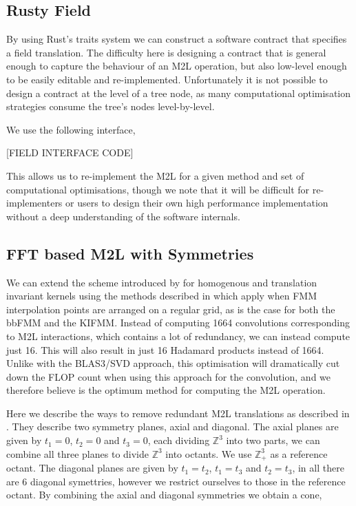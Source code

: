 \documentclass[12pt, a4, twoside]{article}
\begin{document}
\subsection{Rusty Field}

By using Rust's traits system we can construct a software contract that specifies a field translation. The difficulty here is designing a contract that is general enough to capture the behaviour of an M2L operation, but also low-level enough to be easily editable and re-implemented. Unfortunately it is not possible to design a contract at the level of a tree node, as many computational optimisation strategies consume the tree's nodes level-by-level.

We use the following interface,


[FIELD INTERFACE CODE]


This allows us to re-implement the M2L for a given method and set of computational optimisations, though we note that it will be difficult for re-implementers or users to design their own high performance implementation without a deep understanding of the software internals.

\subsection{FFT based M2L with Symmetries}

We can extend the scheme introduced by \cite{Malhotra2015} for homogenous and translation invariant kernels using the methods described in \cite{Messner2012} which apply when FMM interpolation points are arranged on a regular grid, as is the case for both the bbFMM and the KIFMM. Instead of computing 1664 convolutions corresponding to  M2L interactions, which contains a lot of redundancy, we can instead compute just 16. This will also result in just 16 Hadamard products instead of 1664. Unlike with the BLAS3/SVD approach, this optimisation will dramatically cut down the FLOP count when using this approach for the convolution, and we therefore believe is the optimum method for computing the M2L operation.

Here we describe the ways to remove redundant M2L translations as described in \cite{Messner2012}. They describe two symmetry planes, axial and diagonal. The axial planes are given by $t_1 = 0$, $t_2 = 0$ and $t_3 = 0$, each dividing $\mathbb{Z}^3$ into two parts, we can combine all three planes to divide $\mathbb{Z}^3$ into octants. We use $\mathbb{Z}^3_+$ as a reference octant. The diagonal planes are given by $t_1 = t_2$, $t_1 = t_3$ and $t_2 = t_3$, in all there are 6 diagonal symettries, however we restrict ourselves to those in the reference octant. By combining the axial and diagonal symmetries we obtain a cone,
\end{document}
